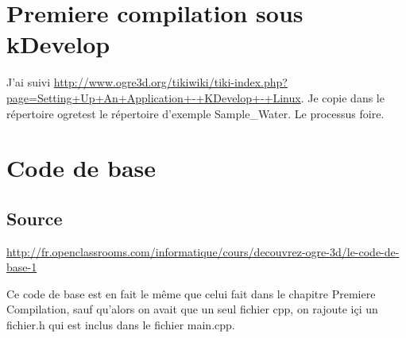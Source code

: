 \section{Premiere compilation sous kDevelop}
J'ai suivi\newline
\url{http://www.ogre3d.org/tikiwiki/tiki-index.php?page=Setting+Up+An+Application+-+KDevelop+-+Linux}.\newline
Je copie dans le répertoire ogretest le répertoire d'exemple Sample\_Water. Le processus foire.




\section{Code de base}
\subsection{Source}
\url{http://fr.openclassrooms.com/informatique/cours/decouvrez-ogre-3d/le-code-de-base-1}

Ce code de base est en fait le même que celui fait dans le chapitre Premiere Compilation, sauf qu'alors on avait que un seul fichier cpp, on rajoute i\c{c}i un fichier.h qui est inclus dans le fichier main.cpp.


